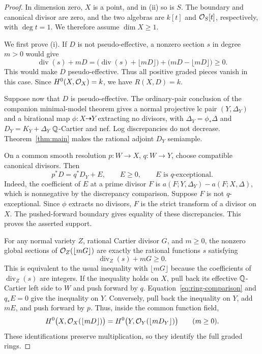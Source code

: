 \begin{proof}
In dimension zero, \(X\) is a point, and in \textup{(ii)} so is \(S\).
The boundary and canonical divisor are zero, and the two algebras are
\(k[t]\) and \(\mathcal{O}_S[t]\), respectively, with \(\deg t=1\).
We therefore assume \(\dim X\geq1\).

We first prove \textup{(i)}. If \(D\) is not pseudo-effective, a nonzero
section \(s\) in degree \(m>0\) would give
\[
 \operatorname{div}(s)+mD
 =\bigl(\operatorname{div}(s)+\lfloor mD\rfloor\bigr)
   +\bigl(mD-\lfloor mD\rfloor\bigr)\geq0.
\]
This would make \(D\) pseudo-effective. Thus all positive graded pieces
vanish in this case. Since \(H^0(X,\mathcal{O}_X)=k\), we have \(R(X,D)=k\).

Suppose now that \(D\) is pseudo-effective. The ordinary-pair conclusion
of the companion minimal-model theorem
\cite[Corollary~1.2]{OpenAIMinimalModels2026} gives a normal projective lc
pair \((Y,\Delta_Y)\) and a birational map \(\phi:X\dashrightarrow Y\)
extracting no divisors, with \(\Delta_Y=\phi_*\Delta\) and
\(D_Y=K_Y+\Delta_Y\) \(\mathbb{Q}\)-Cartier and nef. Log discrepancies do not decrease.
Theorem~\ref{thm:main} makes the rational adjoint \(D_Y\) semiample.

On a common smooth resolution \(p:W\to X\), \(q:W\to Y\), choose
compatible canonical divisors. Then
\begin{equation}\label{eq:ring-comparison}
 p^*D=q^*D_Y+E,\qquad E\geq0,\qquad E\text{ is }q\text{-exceptional}.
\end{equation}
Indeed, the coefficient of \(E\) at a prime divisor \(F\) is
\(a(F;Y,\Delta_Y)-a(F;X,\Delta)\), which is nonnegative by the discrepancy
comparison. Suppose \(F\) is not \(q\)-exceptional. Since \(\phi\) extracts no
divisors, \(F\) is the strict transform of a divisor on \(X\). The
pushed-forward boundary gives equality of these discrepancies. This proves
the asserted support.

For any normal variety \(Z\), rational Cartier divisor \(G\), and
\(m\geq0\), the nonzero global sections of \(\mathcal{O}_Z(\lfloor mG\rfloor)\) are
exactly the rational functions \(s\) satisfying
\[
 \operatorname{div}_Z(s)+mG\geq0.
\]
This is equivalent to the usual inequality with \(\lfloor mG\rfloor\)
because the coefficients of \(\operatorname{div}_Z(s)\) are integers.
If the inequality holds on \(X\), pull back its effective \(\mathbb{Q}\)-Cartier
left side to \(W\) and push forward by \(q\). Equation~\eqref{eq:ring-comparison}
and \(q_*E=0\) give the inequality on \(Y\). Conversely, pull back the
inequality on \(Y\), add \(mE\), and push forward by \(p\). Thus, inside
the common function field,
\[
 H^0\bigl(X,\mathcal{O}_X(\lfloor mD\rfloor)\bigr)
 =H^0\bigl(Y,\mathcal{O}_Y(\lfloor mD_Y\rfloor)\bigr)
 \qquad(m\geq0).
\]
These identifications preserve multiplication, so they identify the full
graded rings.


\end{proof}
